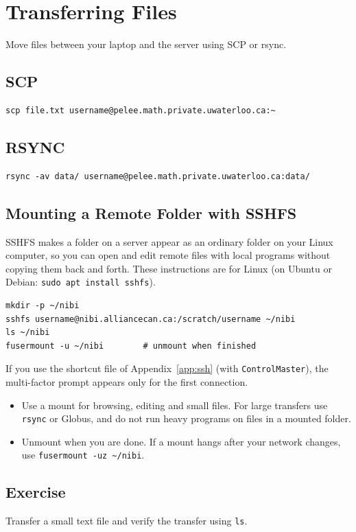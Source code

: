 \section{Transferring Files}

Move files between your laptop and the server using SCP or rsync.

\subsection{SCP}

\begin{lstlisting}
scp file.txt username@pelee.math.private.uwaterloo.ca:~
\end{lstlisting}

\subsection{RSYNC}

\begin{lstlisting}
rsync -av data/ username@pelee.math.private.uwaterloo.ca:data/
\end{lstlisting}

\subsection{Mounting a Remote Folder with SSHFS}

SSHFS makes a folder on a server appear as an ordinary folder on your Linux computer, so you can
open and edit remote files with local programs without copying them back and forth. These
instructions are for Linux (on Ubuntu or Debian: \texttt{sudo apt install sshfs}).

\begin{lstlisting}
mkdir -p ~/nibi
sshfs username@nibi.alliancecan.ca:/scratch/username ~/nibi
ls ~/nibi
fusermount -u ~/nibi        # unmount when finished
\end{lstlisting}

If you use the shortcut file of Appendix~\ref{app:ssh} (with \texttt{ControlMaster}), the
multi-factor prompt appears only for the first connection.

\begin{itemize}
\item Use a mount for browsing, editing and small files. For large transfers use
\texttt{rsync} or Globus, and do not run heavy programs on files in a mounted folder.
\item Unmount when you are done. If a mount hangs after your network changes, use
\texttt{fusermount -uz \textasciitilde/nibi}.
\end{itemize}

\subsection{Exercise}

Transfer a small text file and verify the transfer using \texttt{ls}.
